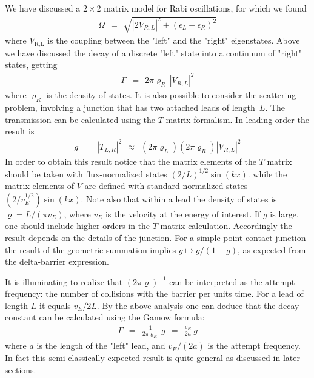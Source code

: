 \documentclass[onecolumn,fleqn]{revtex4}
\newcommand{\beq}{\begin{eqnarray}}
\newcommand{\eeq}{\end{eqnarray}}
\begin{document}
We have discussed a $2\times 2$ matrix model for Rabi oscillations, 
for which we found 
\beq
\Omega \ \ = \ \ \sqrt { |2V_{R,L}|^2 + (\epsilon_L-\epsilon_R)^2 } 
\eeq
where $V_{\text{R,L}}$ is the coupling between the "left" and the "right" eigenstates.   
Above we have discussed the decay of a discrete "left" state 
into a continuum of "right" states, getting
\beq
\Gamma  \ \ = \ \ 2\pi\varrho_R \, |V_{R,L}|^2
\eeq
where $\varrho_R$ is the density of states. 
It is also possible to consider the scattering problem,  
involving a junction that has two attached leads of length~$L$. 
The transmission can be calculated using the $T$-matrix 
formalism. In leading order the result is 
\beq
g \ \ = \ \  |T_{L,R}|^2 \ \ \approx \ \ (2\pi\varrho_L) (2\pi\varrho_R) |V_{R,L}|^2 
\eeq
In order to obtain this result notice that 
the matrix elements of the $T$ matrix should be 
taken with flux-normalized states ${(2/L)^{1/2}\sin(kx)}$. 
while the matrix elements of $V$ are defined  
with standard normalized states ${ (2/v_E^{1/2}) \sin(kx)}$. 
Note also that within a lead the density 
of states is ${\varrho=L/(\pi v_E)}$, where $v_E$ 
is the velocity at the energy of interest.    
If $g$ is large, one should include higher orders in the $T$ matrix calculation. 
Accordingly the result depends on the details of the junction. 
For a simple point-contact junction the result 
of the geometric summation implies ${g \mapsto g/(1+g)}$, 
as expected from the delta-barrier expression. 


It is illuminating to realize that $(2\pi\varrho)^{-1}$ 
can be interpreted as the attempt frequency: 
the number of collisions with the barrier per units time. 
For a lead of length $L$ it equals ${v_E/2L}$. 
By the above analysis one can deduce that the decay constant 
can be calculated using the Gamow formula:
\beq
\Gamma \ \ = \ \ \frac{1}{2\pi\varrho_R} \ g  \ \ = \ \ \frac{v_E}{2a} \ g 
\eeq   
where $a$ is the length of the "left" lead, 
and $v_E/(2a)$ is the attempt frequency. 
In fact this semi-classically expected result 
is quite general as discussed in later sections.
\end{document}

